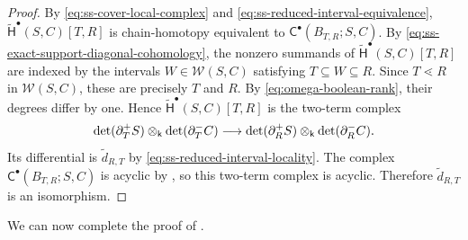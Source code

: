 \begin{proof}
By \eqref{eq:ss-cover-local-complex} and
\eqref{eq:ss-reduced-interval-equivalence},
$\widetilde{\mathsf H}^\bullet(S,C)[T,R]$ is chain-homotopy
equivalent to
$\mathsf C^\bullet(B_{T,R};S,C)$.
By \eqref{eq:ss-exact-support-diagonal-cohomology}, the nonzero
summands of $\widetilde{\mathsf H}^\bullet(S,C)[T,R]$ are indexed by
the intervals $W\in\mathcal W(S,C)$ satisfying
$T\subseteq W\subseteq R$.
Since $T\lessdot R$ in $\mathcal W(S,C)$, these are precisely
$T$ and $R$.
By \eqref{eq:omega-boolean-rank}, their degrees differ by one.
Hence $\widetilde{\mathsf H}^\bullet(S,C)[T,R]$ is the two-term complex
\[
\det(\partial_T^+S)\otimes_{\mathsf{k}}\det(\partial_T^-C)
\longrightarrow
\det(\partial_R^+S)\otimes_{\mathsf{k}}\det(\partial_R^-C).
\]
Its differential is $\widetilde d_{R,T}$ by
\eqref{eq:ss-reduced-interval-locality}.
The complex $\mathsf C^\bullet(B_{T,R};S,C)$ is acyclic by
, so this two-term complex is
acyclic. Therefore $\widetilde d_{R,T}$ is an isomorphism.
\end{proof}


We can now complete the proof of
.


